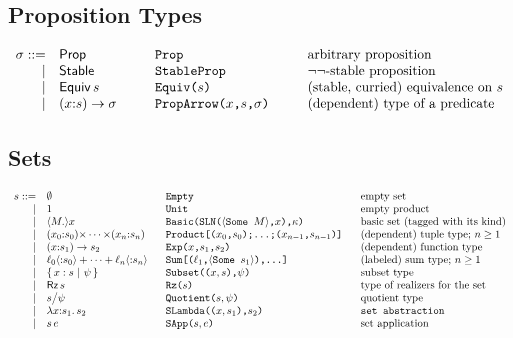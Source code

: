 \documentclass[12pt]{article}
\newcommand{\M}{M}
\newcommand{\e}{e}
\newcommand{\s}{s}
\newcommand{\n}{x} %
\newcommand{\p}{\psi} %
\newcommand{\pt}{\sigma} %
\newcommand{\x}{\n} %
\renewcommand{\k}{\kappa} %
\renewcommand{\l}{{\ell}}
\newcommand{\ptProp}{\mathsf{Prop}}
\newcommand{\ptStable}{\mathsf{Stable}}
\newcommand{\ptEquiv}[1]{\mathop{\mathsf{Equiv}} #1}
\newcommand{\ptArrow}[3]{(#1{:}#2)\to #3}
\newcommand{\sArrow}[3]{(#1{:}#2)\to #3}
\newcommand{\sLambda}[3]{\lambda #1{:}#2.\,#3}
\newcommand{\sApp}[2]{#1\,#2}
\newcommand{\sSubset}[3]{\{\,#1:#2\ |\ #3\,\}}
\newcommand{\sQuotient}[2]{#1 {\bigm/} #2}
\newcommand{\sEmpty}{\emptyset}
\newcommand{\sUnit}{1}
\newcommand{\sProduct}[3]{(#1_0{:}#2_0){\times}\cdots{\times}(#1_{#3}{:}#2_{#3})}
\newcommand{\sRz}[1]{\mathop{\mathsf{Rz}} #1}
\newcommand{\sSum}[3]{#1_0\langle{:}#2_0\rangle+\cdots+#1_{#3}\langle{:}#2_{#3}\rangle}
\begin{document}
\subsection{Proposition Types}
\[
\begin{array}{rl@{\hspace{1cm}}l@{\hspace{1cm}}l}
\pt ::= & \ptProp & \texttt{Prop} & \mbox{arbitrary proposition}\\
   |& \ptStable & \texttt{StableProp} & \mbox{$\lnot\lnot$-stable proposition}\\
  |& \ptEquiv{\s} & \texttt{Equiv($\s$)} &\mbox{(stable, curried) equivalence on $\s$}\\
 |& \ptArrow{\x}{\s}{\pt} & \texttt{PropArrow($\x$,$\s$,$\pt$)} & \mbox{(dependent) type of a predicate}\\
\end{array}
\]

\subsection{Sets}
\[
\begin{array}{rl@{\hspace{0.6cm}}l@{\hspace{0.6cm}}l}
\s ::= & \sEmpty & \texttt{Empty} & \mbox{empty set}\\
|& \sUnit & \texttt{Unit} & \mbox{empty product}\\
|&\langle\M.\rangle\n & \texttt{Basic(SLN($\langle$Some $\M\rangle$,$\n$),$\k$)} & \mbox{basic set (tagged with its kind)}\\
|& \sProduct{\x}{\s}{n} & 
    \texttt{Product[($\x_0$,$\s_0$);\ldots;($\x_{n-1}$,$\s_{n-1}$)]}&\mbox{(dependent) tuple type; $n\ge 1$}\\
|& \sArrow{\x}{\s_1}{\s_2} & \texttt{Exp($\x$,$\s_1$,$\s_2$)} & \mbox{(dependent) function type}\\
|& \sSum{\l}{\s}{n} & \texttt{Sum[($\l_1$,$\langle$Some $\s_1$$\rangle$),\ldots] }& \mbox{(labeled) sum type; $n\ge 1$}\\
|&\sSubset{\x}{\s}{\p} & \texttt{Subset(($\x,\s$),$\p$)} & \mbox{subset type}\\
|&\sRz{\s} & \texttt{Rz($\s$)} & \mbox{type of realizers for the set}\\
|&\sQuotient{\s}{\p} & \texttt{Quotient($\s,\p$)} & \mbox{quotient type}\\
|&\sLambda{\x}{\s_1}{\s_2}&\texttt{SLambda(($\x,\s_1$),$\s_2$)}&\texttt{set abstraction}\\
|&\sApp{\s}{\e}&\texttt{SApp($\s,\e$)}&\mbox{set application}\\
\end{array}
\]
\end{document}
